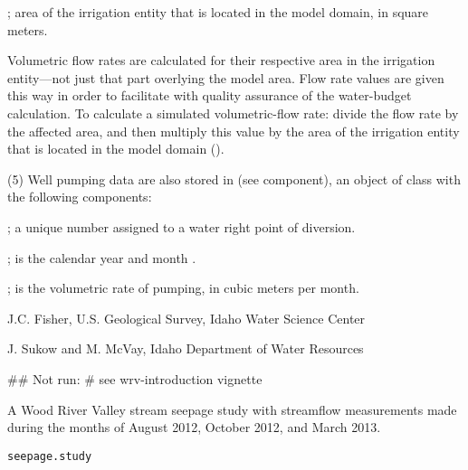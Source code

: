 \documentclass[a4paper]{book}
\begin{document}
\begin{Value}
\begin{ldescription}
\item[\code{area.model}] ; area of the irrigation entity that is located in the model domain, in square meters.
\end{ldescription}
Volumetric flow rates are calculated for their respective area in the irrigation entity---not just that part overlying the model area.
Flow rate values are given this way in order to facilitate with quality assurance of the water-budget calculation.
To calculate a simulated volumetric-flow rate: divide the flow rate by the affected area, and then multiply this value by the area of the irrigation entity that is located in the model domain ().

(5) Well pumping data are also stored in  (see  component), an object of  class with the following components:
\begin{ldescription}
\item[\code{WMISNumber}] ; a unique number assigned to a water right point of diversion.
\item[\code{YearMonth}] ; is the calendar year and month .
\item[\code{Pumping}] ; is the volumetric rate of pumping, in cubic meters per month.
\end{ldescription}
\end{Value}
%
\begin{Author}\relax
J.C. Fisher, U.S. Geological Survey, Idaho Water Science Center

J. Sukow and M. McVay, Idaho Department of Water Resources
\end{Author}
%
\begin{SeeAlso}\relax
{}
\end{SeeAlso}
%
\begin{Examples}
\begin{ExampleCode}
## Not run: # see wrv-introduction vignette
\end{ExampleCode}
\end{Examples}
%
\begin{Description}\relax
A Wood River Valley stream seepage study with streamflow measurements made during the months of August 2012, October 2012, and March 2013.
\end{Description}
%
\begin{Usage}
\begin{verbatim}
seepage.study
\end{verbatim}
\end{Usage}
\end{document}
